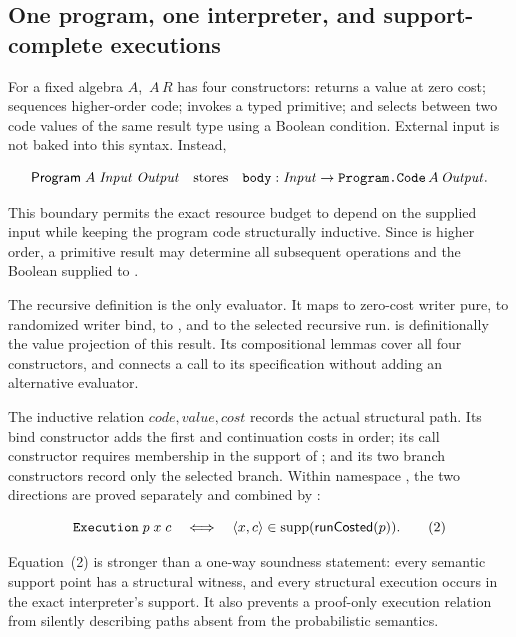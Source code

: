 \subsection{One program, one interpreter, and support-complete executions}

For a fixed algebra \(A\), \(\,A\,R\) has four constructors:
 returns a value at zero cost;  sequences higher-order
code;  invokes a typed primitive; and  selects between
two code values of the same result type using a Boolean condition.  External
input is not baked into this syntax.  Instead,

\[
  \mathsf{Program}\;A\;\mathit{Input}\;\mathit{Output}
  \quad\text{stores}\quad
  \decl{body}:\mathit{Input}\to\decl{Program.Code}\,A\,\mathit{Output}.
\]

This boundary permits the exact resource budget to depend on the supplied
input while keeping the program code structurally inductive.  Since
 is higher order, a primitive result may determine all subsequent
operations and the Boolean supplied to .

The recursive definition  is the only evaluator.
It maps  to zero-cost writer pure,  to randomized writer
bind,  to , and  to the selected recursive
run.   is definitionally the value projection of
this result.  Its compositional lemmas cover all four constructors, and
 connects a call to its
 specification without adding an alternative evaluator.

The inductive relation \(
\mathit{code},\mathit{value},\mathit{cost}\) records
the actual structural path.  Its bind constructor adds the first and
continuation costs in order; its call constructor requires membership in the
support of ; and its two branch constructors record only the
selected branch.  Within namespace , the two directions are
proved separately and combined by
:

\[
  \decl{Execution}\;p\;x\;c
  \quad\Longleftrightarrow\quad
  \langle x,c\rangle\in\operatorname{supp}(\runC(p)).
  \tag{2}
\]

Equation~(2) is stronger than a one-way soundness statement: every semantic
support point has a structural witness, and every structural execution occurs
in the exact interpreter's support.  It also prevents a proof-only execution
relation from silently describing paths absent from the probabilistic
semantics.

